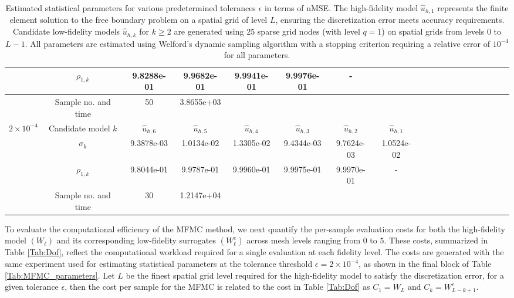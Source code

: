 \begin{table}[ht]
{\begin{tabular}{|c|c|c|c|c|c|c|c|c|c|c|c|c|c|c|c|c|c|c|}
\cline{2-7}	
&\multicolumn{1}{|c|}{$\rho_{1,k}$}&9.8288e-01&9.9682e-01&9.9941e-01  &9.9976e-01&- &\\
\hline
&\multicolumn{1}{|c|}{Sample no. and time}&50&3.8655e+03\\
\hline
\multirow{3}{*}{$2\times 10^{-4}$} &\multicolumn{1}{|c|}{Candidate model $k$} &$\widehat u_{h,6}$&$\widehat u_{h,5}$&$\widehat u_{h,4}$&$\widehat u_{h,3}$&$\widehat u_{h,2}$&$\widehat u_{h,1}$\\
\cline{2-8}
&\multicolumn{1}{|c|}{$\sigma_{k}$}&9.3878e-03&1.0134e-02&1.3305e-02&9.4344e-03&9.7624e-03&1.0524e-02\\
\cline{2-8}	
&\multicolumn{1}{|c|}{$\rho_{1,k}$}&9.8044e-01&9.9787e-01&9.9960e-01&9.9975e-01&9.9970e-01   &-\\
\hline
&\multicolumn{1}{|c|}{Sample no. and time}&30&1.2147e+04\\
\hline
\end{tabular}}
\caption{Estimated statistical parameters for various predetermined tolerances $\epsilon$ in terms of nMSE. The high-fidelity model $\widehat u_{h,1}$ represents the finite element solution to the free boundary problem on a spatial grid of level $L$, ensuring the discretization error meets accuracy requirements. Candidate low-fidelity models $\widehat u_{h,k}$ for $k \geq 2$ are generated using 25 sparse grid nodes (with level $q=1$) on spatial grids from levels 0 to $L-1$. All parameters are estimated using Welford's dynamic sampling algorithm with a stopping criterion requiring a relative error of $10^{-4}$ for all parameters.}
\label{Tab:MFMC_parameters_dynamic}
\end{table}
%


To evaluate the computational efficiency of the MFMC method, we next quantify the per-sample evaluation costs for both the high-fidelity model $(W_\ell)$ and its corresponding low-fidelity surrogates $(W_\ell^e)$ across mesh levels ranging from $0$ to $5$. These costs, summarized in Table \ref{Tab:Dof}, reflect the computational workload required for a single evaluation at each fidelity level. The costs are generated with the same experiment used for estimating statistical parameters at the tolerance threshold $\epsilon=2\times 10^{-4}$, as shown in the final block of Table \ref{Tab:MFMC_parameters}. Let $L$ be the finest spatial grid level required for the high-fidelity model to satisfy the discretization error, for a given tolerance $\epsilon$, then the cost per sample for the MFMC is related to the cost in Table \ref{Tab:Dof} as $C_1=W_{L}$ and $C_k=W_{L-k+1}^e$.

